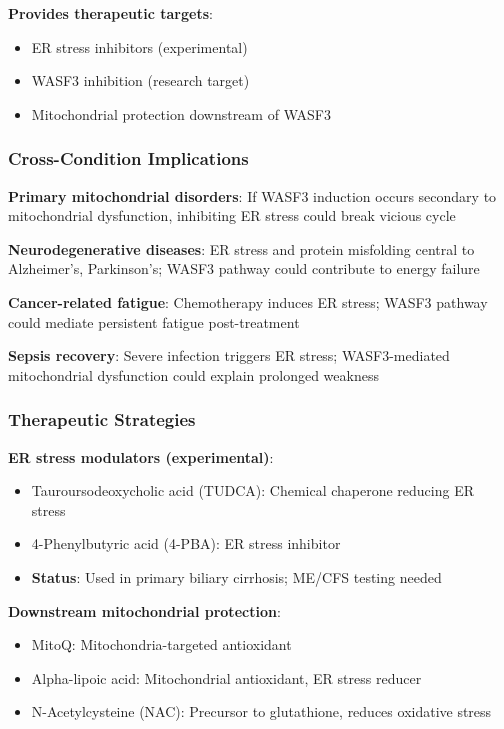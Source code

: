 \textbf{Provides therapeutic targets}:
\begin{itemize}
    \item ER stress inhibitors (experimental)
    \item WASF3 inhibition (research target)
    \item Mitochondrial protection downstream of WASF3
\end{itemize}

\subsubsection{Cross-Condition Implications}

\textbf{Primary mitochondrial disorders}: If WASF3 induction occurs secondary to mitochondrial dysfunction, inhibiting ER stress could break vicious cycle

\textbf{Neurodegenerative diseases}: ER stress and protein misfolding central to Alzheimer's, Parkinson's; WASF3 pathway could contribute to energy failure

\textbf{Cancer-related fatigue}: Chemotherapy induces ER stress; WASF3 pathway could mediate persistent fatigue post-treatment

\textbf{Sepsis recovery}: Severe infection triggers ER stress; WASF3-mediated mitochondrial dysfunction could explain prolonged weakness

\subsubsection{Therapeutic Strategies}

\textbf{ER stress modulators (experimental)}:
\begin{itemize}
    \item Tauroursodeoxycholic acid (TUDCA): Chemical chaperone reducing ER stress
    \item 4-Phenylbutyric acid (4-PBA): ER stress inhibitor
    \item \textbf{Status}: Used in primary biliary cirrhosis; ME/CFS testing needed
\end{itemize}

\textbf{Downstream mitochondrial protection}:
\begin{itemize}
    \item MitoQ: Mitochondria-targeted antioxidant
    \item Alpha-lipoic acid: Mitochondrial antioxidant, ER stress reducer
    \item N-Acetylcysteine (NAC): Precursor to glutathione, reduces oxidative stress
\end{itemize}

